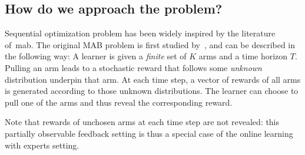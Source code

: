 

\subsection{How do we approach the problem?}\label{sec:intro.context.how}

Sequential optimization problem has been widely inspired by the literature of~\gls{mab}. The original MAB problem is first studied by~\cite{thompson1933}, and can be described in the following way: A learner is given a \emph{finite} set of $K$ arms and a time horizon $T$. Pulling an arm leads to a stochastic reward that follows some \emph{unknown} distribution underpin that arm. At each time step, a vector of rewards of all arms is generated according to those unknown distributions. The learner can choose to pull one of the arms and thus reveal the corresponding reward.

\begin{remark}\label{remark:partial}
\begin{leftbar}[remarkbar]
Note that rewards of unchosen arms at each time step are not revealed: this partially observable feedback setting is thus a special case of the online learning with experts setting.
\end{leftbar}
\end{remark}

